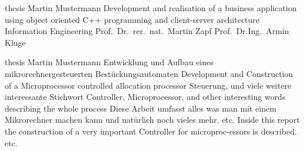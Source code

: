 



													{thesis}																			%
													{Martin Mustermann}														%
													{Development and  realisation of a business application
													 using object oriented C++ programming and client-server
													 architecture}											  %
													{Information Engineering}						%
													{Prof.\ Dr.\ rer.\ nat.\ Martin Zapf}					%
													{Prof.\ Dr.\-Ing.\ Armin Kluge}								%
													

													{thesis}																			%
													{Martin Mustermann}														%
													{Entwicklung und Aufbau eines 
													 mikrorechnergesteuerten 
													 Best\"uckungsautomaten}											  %
													{Development and Construction of a Microprocessor 
													controlled allocation processor}							%
													{Steuerung, und viele weitere interessante 
													Stichwort}																		%
													{Controller, Microprocessor, and other 
													interesting words describing the whole 
													process}																			%
													{Diese Arbeit umfasst alles was man mit einem 
													Mikrorechner machen kann und nat\"urlich noch vieles mehr.
													etc.}																					%
													{Inside this report the construction of a very 
													important Controller for microproc-essors is 
													described.												
													etc.}																			%

